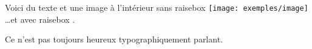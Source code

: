 Voici du texte et une image à l'intérieur 
sans raisebox
\texttt{[image: exemples/image]}
\dots et avec raisebox .

Ce n'est pas toujours heureux 
typographiquement parlant.